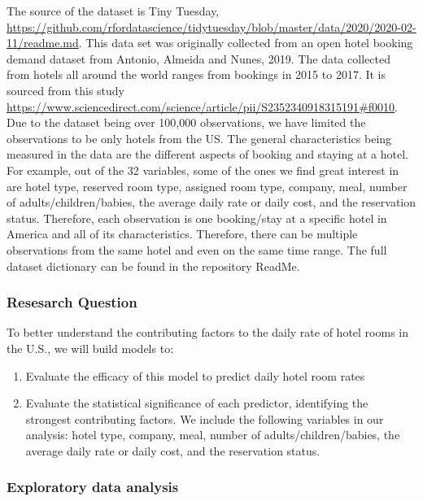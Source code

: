 \documentclass[
]{article}
\providecommand{\tightlist}{%
  \setlength{\itemsep}{0pt}\setlength{\parskip}{0pt}}
\begin{document}
The source of the dataset is Tiny Tuesday,
\url{https://github.com/rfordatascience/tidytuesday/blob/master/data/2020/2020-02-11/readme.md}.
This data set was originally collected from an open hotel booking demand
dataset from Antonio, Almeida and Nunes, 2019. The data collected from
hotels all around the world ranges from bookings in 2015 to 2017. It is
sourced from this study
\url{https://www.sciencedirect.com/science/article/pii/S2352340918315191\#f0010}.
Due to the dataset being over 100,000 observations, we have limited the
observations to be only hotels from the US. The general characteristics
being measured in the data are the different aspects of booking and
staying at a hotel. For example, out of the 32 variables, some of the
ones we find great interest in are hotel type, reserved room type,
assigned room type, company, meal, number of adults/children/babies, the
average daily rate or daily cost, and the reservation status. Therefore,
each observation is one booking/stay at a specific hotel in America and
all of its characteristics. Therefore, there can be multiple
observations from the same hotel and even on the same time range. The
full dataset dictionary can be found in the repository ReadMe.

\hypertarget{resesarch-question}{%
\subsubsection{Resesarch Question}\label{resesarch-question}}

To better understand the contributing factors to the daily rate of hotel
rooms in the U.S., we will build models to:

\begin{enumerate}
\def\labelenumi{\arabic{enumi})}
\tightlist
\item
  Evaluate the efficacy of this model to predict daily hotel room rates
\item
  Evaluate the statistical significance of each predictor, identifying
  the strongest contributing factors. We include the following variables
  in our analysis: hotel type, company, meal, number of
  adults/children/babies, the average daily rate or daily cost, and the
  reservation status.
\end{enumerate}

\hypertarget{exploratory-data-analysis}{%
\subsubsection{Exploratory data
analysis}\label{exploratory-data-analysis}}
\end{document}
